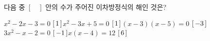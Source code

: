 다음 중 $[\quad]$ 안의 수가 주어진 이차방정식의 해인 것은?
\begin{choicesv}{$x^2-2x-3=0$ \qquad $[\mkern3mu 1\mkern3mu ]$}{$x^2-3x+5=0$ \qquad $[\mkern3mu 1\mkern3mu ]$}{$(x-3)(x-5)=0$ \qquad $[\mkern3mu -3\mkern3mu ]$}{$3x^2-x-2=0$ \qquad $[\mkern3mu -1\mkern3mu ]$}{$x(x-4)=12$ \qquad $[\mkern3mu 6\mkern3mu ]$}\end{choicesv}
